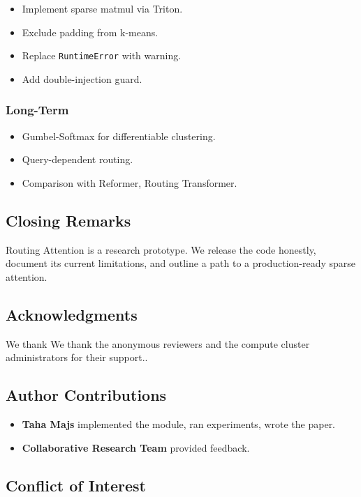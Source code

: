 \begin{itemize}
\item Implement sparse matmul via Triton.
\item Exclude padding from k-means.
\item Replace \texttt{RuntimeError} with warning.
\item Add double-injection guard.

\end{itemize}
\subsubsection{Long-Term}

\begin{itemize}
\item Gumbel-Softmax for differentiable clustering.
\item Query-dependent routing.
\item Comparison with Reformer, Routing Transformer.

\end{itemize}
\subsection{Closing Remarks}

Routing Attention is a research prototype. We release the code honestly, 
document its current limitations, and outline a path to a production-ready 
sparse attention.

\subsection{Acknowledgments}

We thank We thank the anonymous reviewers and the compute cluster administrators for their support..

\subsection{Author Contributions}

\begin{itemize}
\item \textbf{Taha Majs} implemented the module, ran experiments, wrote the paper.
\item \textbf{Collaborative Research Team} provided feedback.

\end{itemize}
\subsection{Conflict of Interest}

